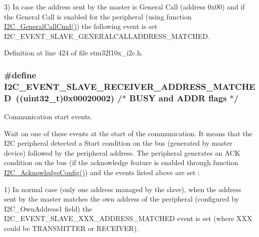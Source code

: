 3) In case the address sent by the master is General Call (address 0x00) and if the General Call is enabled for the peripheral (using function \hyperlink{group___i2_c___private___functions_ga65c740fc8d7b3b9f15cc432d8699d471}{I2\+C\+\_\+\+General\+Call\+Cmd()}) the following event is set I2\+C\+\_\+\+E\+V\+E\+N\+T\+\_\+\+S\+L\+A\+V\+E\+\_\+\+G\+E\+N\+E\+R\+A\+L\+C\+A\+L\+L\+A\+D\+D\+R\+E\+S\+S\+\_\+\+M\+A\+T\+C\+H\+ED. 

Definition at line 424 of file stm32f10x\+\_\+i2c.\+h.

\subsubsection[{\texorpdfstring{I2\+C\+\_\+\+E\+V\+E\+N\+T\+\_\+\+S\+L\+A\+V\+E\+\_\+\+R\+E\+C\+E\+I\+V\+E\+R\+\_\+\+A\+D\+D\+R\+E\+S\+S\+\_\+\+M\+A\+T\+C\+H\+ED}{I2C_EVENT_SLAVE_RECEIVER_ADDRESS_MATCHED}}]{\setlength{\rightskip}{0pt plus 5cm}\#define I2\+C\+\_\+\+E\+V\+E\+N\+T\+\_\+\+S\+L\+A\+V\+E\+\_\+\+R\+E\+C\+E\+I\+V\+E\+R\+\_\+\+A\+D\+D\+R\+E\+S\+S\+\_\+\+M\+A\+T\+C\+H\+ED~(({\bf uint32\+\_\+t})0x00020002) /$\ast$ B\+U\+S\+Y and A\+D\+D\+R flags $\ast$/}\hypertarget{group___i2_c___events_ga6cf0e334704618b024eee604849f50f7}{}\label{group___i2_c___events_ga6cf0e334704618b024eee604849f50f7}


Communication start events. 

Wait on one of these events at the start of the communication. It means that the I2C peripheral detected a Start condition on the bus (generated by master device) followed by the peripheral address. The peripheral generates an A\+CK condition on the bus (if the acknowledge feature is enabled through function \hyperlink{group___i2_c___private___functions_ga7bb44e894d68a7991f564c43fb187486}{I2\+C\+\_\+\+Acknowledge\+Config()}) and the events listed above are set \+:

1) In normal case (only one address managed by the slave), when the address sent by the master matches the own address of the peripheral (configured by I2\+C\+\_\+\+Own\+Address1 field) the I2\+C\+\_\+\+E\+V\+E\+N\+T\+\_\+\+S\+L\+A\+V\+E\+\_\+\+X\+X\+X\+\_\+\+A\+D\+D\+R\+E\+S\+S\+\_\+\+M\+A\+T\+C\+H\+ED event is set (where X\+XX could be T\+R\+A\+N\+S\+M\+I\+T\+T\+ER or R\+E\+C\+E\+I\+V\+ER).

